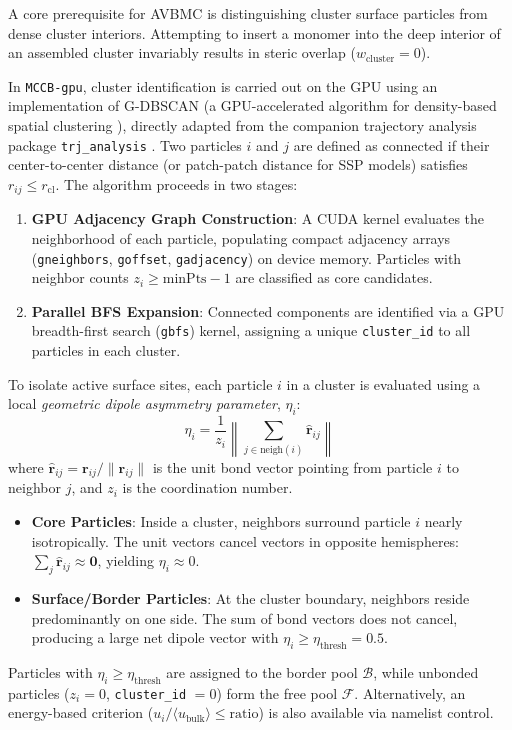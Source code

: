 \documentclass[final,5p,times,twocolumn]{elsarticle}
\begin{document}
A core prerequisite for AVBMC is distinguishing cluster surface
particles from dense cluster interiors. Attempting to insert a monomer
into the deep interior of an assembled cluster invariably results in
steric overlap ($w_{\text{cluster}} = 0$). 

In \texttt{MCCB-gpu}, cluster identification is carried out on the GPU
using an implementation of \textsc{G-DBSCAN} (a GPU-accelerated
algorithm for density-based spatial clustering \cite{andrade2013gdbscan}),
directly adapted from the companion trajectory analysis package
\texttt{trj\_analysis} \cite{trjanaly2026}.  
Two particles $i$ and $j$ are defined as connected if their center-to-center distance (or patch-patch distance for SSP models) satisfies $r_{ij} \le r_{\text{cl}}$. The algorithm proceeds in two stages:
\begin{enumerate}
    \item \textbf{GPU Adjacency Graph Construction}: A CUDA kernel
      evaluates the neighborhood of each particle, populating compact
      adjacency arrays (\texttt{gneighbors}, \texttt{goffset},
      \texttt{gadjacency}) on device memory. Particles with neighbor
      counts $z_i \ge \text{minPts} - 1$ are classified as core
      candidates. 
    \item \textbf{Parallel BFS Expansion}: Connected components are
      identified via a GPU breadth-first search (\texttt{gbfs})
      kernel, assigning a unique \texttt{cluster\_id} to all particles
      in each cluster. 
\end{enumerate}

To isolate active surface sites, each particle $i$ in a cluster is evaluated using a local \textit{geometric dipole asymmetry parameter}, $\eta_i$:
\begin{equation}
    \eta_i = \frac{1}{z_i} \left\| \sum_{j \in \text{neigh}(i)} \hat{\mathbf{r}}_{ij} \right\|
    \label{eq:asym}
\end{equation}
where $\hat{\mathbf{r}}_{ij} = \mathbf{r}_{ij} / \|\mathbf{r}_{ij}\|$
is the unit bond vector pointing from particle $i$ to neighbor $j$,
and $z_i$ is the coordination number. 
\begin{itemize}
    \item \textbf{Core Particles}: Inside a cluster, neighbors
      surround particle $i$ nearly isotropically. The unit vectors
      cancel vectors in opposite hemispheres: $\sum_j
      \hat{\mathbf{r}}_{ij} \approx \mathbf{0}$, yielding $\eta_i
      \approx 0$. 
    \item \textbf{Surface/Border Particles}: At the cluster boundary,
      neighbors reside predominantly on one side. The sum of bond
      vectors does not cancel, producing a large net dipole vector
      with $\eta_i \ge \eta_{\text{thresh}} = 0.5$. 
\end{itemize}
Particles with $\eta_i \ge \eta_{\text{thresh}}$ are assigned to the
border pool $\mathcal{B}$, while unbonded particles ($z_i = 0$,
\texttt{cluster\_id} $= 0$) form the free pool
$\mathcal{F}$. Alternatively, an energy-based criterion ($u_i /
\langle u_{\text{bulk}} \rangle \le \text{ratio}$) is also available
via namelist control. 
\end{document}
